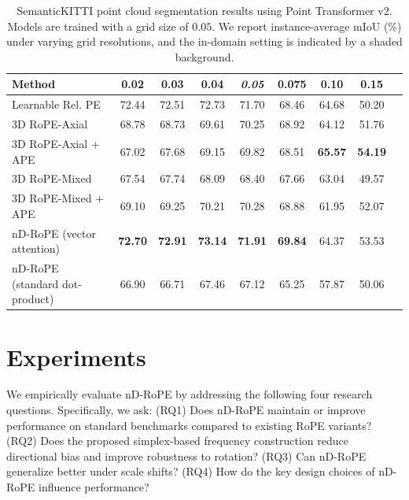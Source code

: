 \documentclass{article}
\theoremstyle{plain}
\theoremstyle{definition}
\theoremstyle{remark}
\begin{document}
\begin{table}[t]
\centering
\small
\caption{SemanticKITTI point cloud segmentation results using Point Transformer v2.
Models are trained with a grid size of $0.05$. We report instance-average mIoU (\%) under varying grid resolutions, and the in-domain setting is indicated by a shaded background.}
\label{tab:semantickitti_extrapolation}
\begin{tabular}{lcccccccc}
\toprule
Method 
& 0.02
& 0.03
& 0.04
& \cellcolor{gray!15}\textit{0.05}
& 0.075 
& 0.10 
& 0.15 \\
\midrule
Learnable Rel. PE
& 72.44 & 72.51 & 72.73 & \cellcolor{gray!15}71.70 & 68.46 & 64.68 & 50.20 \\

3D RoPE-Axial
& 68.78 & 68.73 & 69.61 & \cellcolor{gray!15}70.25 & 68.92 & 64.12 & 51.76 \\

3D RoPE-Axial + APE
& 67.02 & 67.68 & 69.15 & \cellcolor{gray!15}69.82 & 68.51 & \textbf{65.57} & \textbf{54.19} \\

3D RoPE-Mixed
& 67.54 & 67.74 & 68.09 & \cellcolor{gray!15}68.40 & 67.66 & 63.04 & 49.57 \\

3D RoPE-Mixed + APE
& 69.10 & 69.25 & 70.21 & \cellcolor{gray!15}70.28 & 68.88 & 61.95 & 52.07 \\

\midrule
nD-RoPE (vector attention)
& \textbf{72.70} & \textbf{72.91} & \textbf{73.14} & \cellcolor{gray!15}\textbf{71.91} & \textbf{69.84} & 64.37 & 53.53 \\

nD-RoPE (standard dot-product)
& 66.90 & 66.71 & 67.46 & \cellcolor{gray!15}67.12 & 65.25 & 57.87 & 50.06 \\

\bottomrule
\end{tabular}
\end{table}

\section{Experiments}
\label{sec:experiment}

We empirically evaluate nD-RoPE by addressing the following four research questions. Specifically, we ask: (RQ1) Does nD-RoPE maintain or improve performance on standard benchmarks compared to existing RoPE variants? (RQ2) Does the proposed simplex-based frequency construction reduce directional bias and improve robustness to rotation? (RQ3) Can nD-RoPE generalize better under scale shifts? (RQ4) How do the key design choices of nD-RoPE influence performance?
\end{document}
